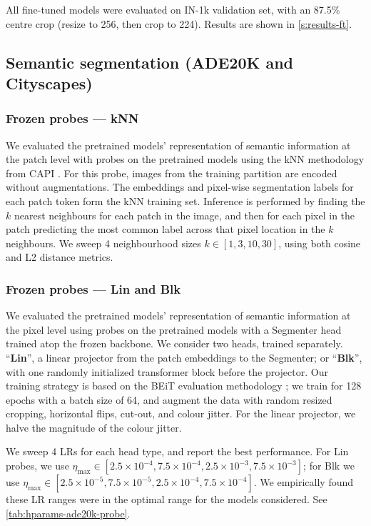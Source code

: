 All fine-tuned models were evaluated on IN-1k validation set, with an 87.5\% centre crop (resize to 256, then crop to 224).
Results are shown in \cref{s:results-ft}.


\subsection{Semantic segmentation (ADE20K and Cityscapes)}
\label{s:method-semseg}

\subsubsection{Frozen probes --- kNN}

We evaluated the pretrained models' representation of semantic information at the patch level with probes on the pretrained models using the kNN methodology from CAPI \citep{darcet2025capi}.
For this probe, images from the training partition are encoded without augmentations.
The embeddings and pixel-wise segmentation labels for each patch token form the kNN training set.
Inference is performed by finding the $k$ nearest neighbours for each patch in the image, and then for each pixel in the patch predicting the most common label across that pixel location in the $k$ neighbours.
We sweep 4 neighbourhood sizes $k \in [1, 3, 10, 30]$, using both cosine and L2 distance metrics.


\subsubsection{Frozen probes --- Lin and Blk}

We evaluated the pretrained models' representation of semantic information at the pixel level using probes on the pretrained models with a Segmenter \citep{strudel2021segmenter} head trained atop the frozen backbone.
We consider two heads, trained separately.
``\textbf{Lin}'', a linear projector from the patch embeddings to the Segmenter; or ``\textbf{Blk}'', with one randomly initialized transformer block before the projector.
Our training strategy is based on the BEiT evaluation methodology \citep{bao2021beit}; we train for 128 epochs with a batch size of 64, and augment the data with random resized cropping, horizontal flips, cut-out, and colour jitter.
For the linear projector, we halve the magnitude of the colour jitter.

We sweep 4 LRs for each head type, and report the best performance.
For Lin probes, we use $\eta_\text{max} \in [2.5{\times}10^{-4}, 7.5{\times}10^{-4}, 2.5{\times}10^{-3}, 7.5{\times}10^{-3}]$; for Blk we use $\eta_\text{max} \in [2.5{\times}10^{-5}, 7.5{\times}10^{-5}, 2.5{\times}10^{-4}, 7.5{\times}10^{-4}]$.
We empirically found these LR ranges were in the optimal range for the models considered.
See \cref{tab:hparams-ade20k-probe}.

